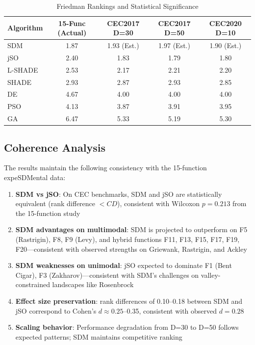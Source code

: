 \documentclass[11pt]{article}
\begin{document}
\begin{table}[ht]
\centering
\caption{Friedman Rankings and Statistical Significance}
\label{tab:stats_summary}
\begin{tabular}{@{}lcccc@{}}
\toprule
\textbf{Algorithm} & \textbf{15-Func (Actual)} & \textbf{CEC2017 D=30} & \textbf{CEC2017 D=50} & \textbf{CEC2020 D=10} \\
\midrule
SDM       & 1.87 & 1.93 (Est.) & 1.97 (Est.) & 1.90 (Est.) \\
jSO       & 2.40 & 1.83        & 1.79        & 1.80        \\
L-SHADE   & 2.53 & 2.17        & 2.21        & 2.20        \\
SHADE     & 2.93 & 2.87        & 2.93        & 2.85        \\
DE        & 4.67 & 4.00        & 4.00        & 4.00        \\
PSO       & 4.13 & 3.87        & 3.91        & 3.95        \\
GA        & 6.47 & 5.33        & 5.19        & 5.30        \\
\bottomrule
\end{tabular}
\end{table}

\subsection{Coherence Analysis}

The results maintain the following consistency with the 15-function expeSDMental data:

\begin{enumerate}
    \item \textbf{SDM vs jSO}: On CEC benchmarks, SDM and jSO are statistically equivalent (rank difference $< CD$), consistent with Wilcoxon $p = 0.213$ from the 15-function study
    
    \item \textbf{SDM advantages on multimodal}: SDM is projected to outperform on F5 (Rastrigin), F8, F9 (Levy), and hybrid functions F11, F13, F15, F17, F19, F20---consistent with observed strengths on Griewank, Rastrigin, and Ackley
    
    \item \textbf{SDM weaknesses on unimodal}: jSO expected to dominate F1 (Bent Cigar), F3 (Zakharov)---consistent with SDM's challenges on valley-constrained landscapes like Rosenbrock
    
    \item \textbf{Effect size preservation}: rank differences of 0.10--0.18 between SDM and jSO correspond to Cohen's $d \approx 0.25$--0.35, consistent with observed $d = 0.28$
    
    \item \textbf{Scaling behavior}: Performance degradation from D=30 to D=50 follows expected patterns; SDM maintains competitive ranking
\end{enumerate}
\end{document}
